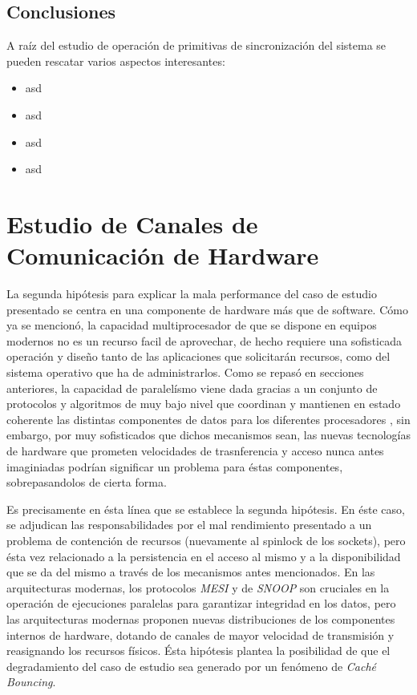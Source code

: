 \subsection{Conclusiones}
A raíz del estudio de operación de primitivas de sincronización del sistema se pueden rescatar varios aspectos interesantes:
\begin{itemize}
\item asd
\item asd
\item asd
\item asd
\end{itemize}

\section{Estudio de Canales de Comunicación de Hardware}
La segunda hipótesis para explicar la mala performance del caso de estudio presentado se centra en una componente de hardware más que de software. Cómo ya se mencionó, la capacidad multiprocesador de que se dispone en equipos modernos no es un recurso facil de aprovechar, de hecho requiere una sofisticada operación y diseño tanto de las aplicaciones que solicitarán recursos, como del sistema operativo que ha de administrarlos. Como se repasó en secciones anteriores, la capacidad de paralelísmo viene dada gracias a un conjunto de protocolos y algoritmos de muy bajo nivel que coordinan y mantienen en estado coherente las distintas componentes de datos para los diferentes procesadores \cite{paper:MESI, paper:snoop}, sin embargo, por muy sofisticados que dichos mecanismos sean, las nuevas tecnologías de hardware que prometen velocidades de trasnferencia y acceso nunca antes imaginiadas podrían significar un problema para éstas componentes, sobrepasandolos de cierta forma.

Es precisamente en ésta línea que se establece la segunda hipótesis. En éste caso, se adjudican las responsabilidades por el mal rendimiento presentado a un problema de contención de recursos (nuevamente al spinlock de los sockets), pero ésta vez relacionado a la persistencia en el acceso al mismo y a la disponibilidad que se da del mismo a través de los mecanismos antes mencionados. En las arquitecturas modernas, los protocolos \emph{MESI} y de \emph{SNOOP} son cruciales en la operación de ejecuciones paralelas para garantizar integridad en los datos, pero las arquitecturas modernas proponen nuevas distribuciones de los componentes internos de hardware, dotando de canales de mayor velocidad de transmisión y reasignando los recursos físicos. Ésta hipótesis plantea la posibilidad de que el degradamiento del caso de estudio sea generado por un fenómeno de \emph{Caché Bouncing}.

